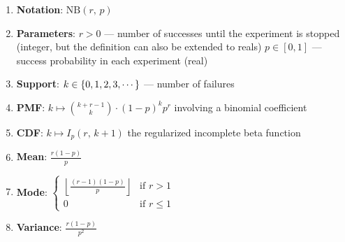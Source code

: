 \begin{enumerate}
    \item \textbf{Notation}: 
    $
         {\displaystyle \mathrm {NB} (r,\,p)}
    $
    \hfill \cite{wiki/Negative_binomial_distribution}

    \item \textbf{Parameters}:
    $r > 0$ — number of successes until the experiment is stopped (integer, but the definition can also be extended to reals) $p \in [0, 1]$ — success probability in each experiment (real)
    \hfill \cite{wiki/Negative_binomial_distribution}

    \item \textbf{Support}: 
     $k \in \left\{0, 1, 2, 3, \cdots\right\}$ — number of failures
    \hfill \cite{wiki/Negative_binomial_distribution}

    \item \textbf{PMF}:
    ${\displaystyle k\mapsto {k+r-1 \choose k}\cdot (1-p)^{k}p^{r}}$ 
    involving a binomial coefficient
    \hfill \cite{wiki/Negative_binomial_distribution}

    \item \textbf{CDF}:
    ${\displaystyle k\mapsto I_{p}(r,\,k+1)}$ 
    the regularized incomplete beta function
    \hfill \cite{wiki/Negative_binomial_distribution}

    \item \textbf{Mean}: 
    $
         {\displaystyle {\frac {r(1-p)}{p}}}
    $
    \hfill \cite{wiki/Negative_binomial_distribution}


    \item \textbf{Mode}: 
    $
         {\displaystyle {\begin{cases}\left\lfloor {\frac {(r-1)(1-p)}{p}}\right\rfloor &{\text{if }}r>1\\0&{\text{if }}r\leq 1\end{cases}}}
    $
    \hfill \cite{wiki/Negative_binomial_distribution}

    \item \textbf{Variance}: 
    $ 
         {\displaystyle {\frac {r(1-p)}{p^{2}}}}
    $
    \hfill \cite{wiki/Negative_binomial_distribution}



\end{enumerate}
